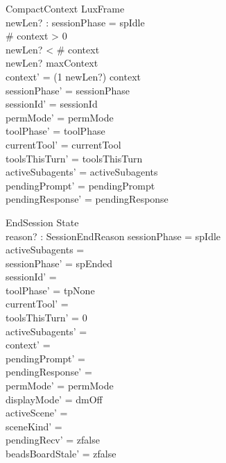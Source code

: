 \documentclass[a4paper,10pt,fleqn]{article}
\begin{document}
\begin{schema}{CompactContext}
  LuxFrame \\
  newLen? : \nat
  \where
  sessionPhase = spIdle \\
  \# context > 0 \\
  newLen? < \# context \\
  newLen? \leq maxContext \\
  context' = (1 \upto newLen?) \dres context \\
  sessionPhase' = sessionPhase \\
  sessionId' = sessionId \\
  permMode' = permMode \\
  toolPhase' = toolPhase \\
  currentTool' = currentTool \\
  toolsThisTurn' = toolsThisTurn \\
  activeSubagents' = activeSubagents \\
  pendingPrompt' = pendingPrompt \\
  pendingResponse' = pendingResponse
\end{schema}

\begin{schema}{EndSession}
  \Delta State \\
  reason? : SessionEndReason
  \where
  sessionPhase = spIdle \\
  activeSubagents = \emptyset \\
  sessionPhase' = spEnded \\
  sessionId' = \emptyset \\
  toolPhase' = tpNone \\
  currentTool' = \emptyset \\
  toolsThisTurn' = 0 \\
  activeSubagents' = \emptyset \\
  context' = \langle \rangle \\
  pendingPrompt' = \emptyset \\
  pendingResponse' = \emptyset \\
  permMode' = permMode \\
  displayMode' = dmOff \\
  activeScene' = \emptyset \\
  sceneKind' = \emptyset \\
  pendingRecv' = zfalse \\
  beadsBoardStale' = zfalse
\end{schema}
\end{document}
